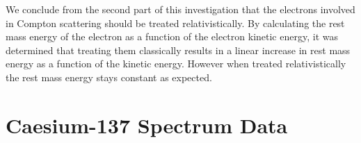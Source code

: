\documentclass[%
reprint,
amsmath,amssymb,
aps,
floatfix
]{revtex4-2}
\begin{document}
		We conclude from the second part of this investigation that the electrons involved in Compton scattering should be treated relativistically. By calculating the rest mass energy of the electron as a function of the electron kinetic energy, it was determined that treating them classically results in a linear increase in rest mass energy as a function of the kinetic energy. However when treated relativistically the rest mass energy stays constant as expected.
		
		
	\clearpage
	
	\clearpage
	\onecolumngrid
	\appendix
	\section{Caesium-137 Spectrum Data}
	
\end{document}
